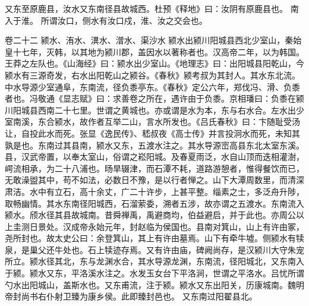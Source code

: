\documentclass[12pt,UTF8]{ctexbook}
\begin{document}
又东至原鹿县，汝水又东南径县故城西。杜预《释地》曰：汝阴有原鹿县也。
南入于淮。
所谓汝口，侧水有汝口戍，淮、汝之交会也。


卷二十二  颍水、洧水、潩水、潧水、渠沙水 
颍水出颍川阳城县西北少室山，秦始皇十七年，灭韩，以其地为颍川郡，盖因水以著称者也。汉高帝二年，以为韩国。王莽之左队也。《山海经》曰：颍水出少室山。《地理志》曰：出阳城县阳乾山，今颍水有三源奇发，右水出阳乾山之颍谷。《春秋》颍考叔为其封人。其水东北流。中水导源少室通阜，东南流，径负黍亭东。《春秋》定公六年，郑伐冯、滑、负黍者也。冯敬通《显志赋》曰：求善卷之所在，遇许由于负黍。京相璠曰：负黍在颍川阳城县西南二十七里。世谓之黄城也。亦或谓是水为本，东与右水合。左水出少室南溪，东合颍水，故作者互举二山，言水所发也。《吕氏春秋》曰：卞随耻受汤让，自投此水而死。张显《逸民传》、嵇叔夜《高士传》并言投泂水而死，未知其孰是也。东南过其县南，颍水又东，五渡水注之。其水导源崈高县东北太室东溪。县，汉武帝置，以奉太室山，俗谓之崧阳城。及春夏雨泛，水自山顶而迭相灌澍，崿流相承，为二十八浦也。旸旱辍津，而石潭不耗，道路游憩者，惟得餐饮而已，无敢澡盥其中，苟不如法，必数日不豫，是以行者惮之。山下大潭周数里，而清深肃洁。水中有立石，高十余丈，广二十许步，上甚平整。缁素之士，多泛舟升陟，取畅幽情。其水东南径阳城西，石溜萦委，溯者五涉，故亦谓之五渡水。东南流入颍水。颀水径其县故城南。昔舜禅禹，禹避商均，伯益避启，并于此也。亦周公以上圭测日景处。汉成帝永始元年，封赵临为侯国也。县南对箕山，山上有许由冢，尧所封也。故太史公曰：余登箕山，其上有许由墓焉。山下有牵牛墟。侧颍水有犊泉，是巢父还牛处也。石上犊迹存焉。又有许由庙，碑阙尚存，是汉颍川大守朱宠所立。颍水径其北，东与龙渊水合，其水导源龙渊，东南流，径阳城北，又东南入于颍。颍水又东，平洛溪水注之。水发玉女台下平洛涧，世谓之平洛水。吕忧所谓勺水出阳城山，盖斯水也。又东甫流，注于颍。颍水又东出阳关，历康城南。魏明帝封尚书右仆射卫臻为康乡侯。此即臻封邑也。
又东南过阳翟县北。
\end{document}
